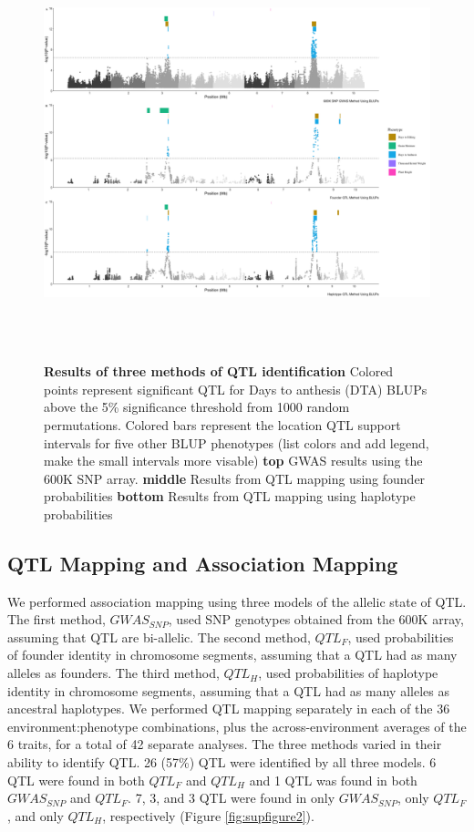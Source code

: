 \documentclass[article,9pt,twocolumn,twoside]{rilabRxiv}
\begin{document}
\begin{figure}[h!t]
\centering
\includegraphics[width=\textwidth,height=12cm]{figures/Methods_Fig3_alltraits.png}
\caption{\textbf{Results of three methods of QTL identification} Colored points represent significant QTL for Days to anthesis (DTA) BLUPs above the 5\% significance threshold from 1000 random permutations. Colored bars represent the location QTL support intervals for five other BLUP phenotypes (list colors and add legend, make the small intervals more visable) \textbf{top} GWAS results using the 600K SNP array. \textbf{middle} Results from QTL mapping using founder probabilities \textbf{bottom} Results from QTL mapping using haplotype probabilities}
\label{fig:figure3}
\end{figure}

\subsection{QTL Mapping and Association Mapping}
We performed association mapping using three models of the allelic state of QTL.
The first method, $GWAS_{SNP}$, used SNP genotypes obtained from the 600K array, assuming that QTL are bi-allelic.
The second method, $QTL_F$, used probabilities of founder identity in chromosome segments, assuming that a QTL had as many alleles as founders.
The third method, $QTL_H$, used probabilities of haplotype identity in chromosome segments, assuming that a QTL had as many alleles as ancestral haplotypes.
We performed QTL mapping separately in each of the 36 environment:phenotype combinations, plus the across-environment averages of the 6 traits, for a total of 42 separate analyses.
The three methods varied in their ability to identify QTL.
26 (57\%) QTL were identified by all three models.
6 QTL were found in both $QTL_F$ and $QTL_H$ and 1 QTL was found in both $GWAS_{SNP}$ and $QTL_F$.
7, 3, and 3 QTL were found in only $GWAS_{SNP}$, only $QTL_F$, and only $QTL_H$, respectively (Figure \ref{fig:supfigure2}).
\end{document}
